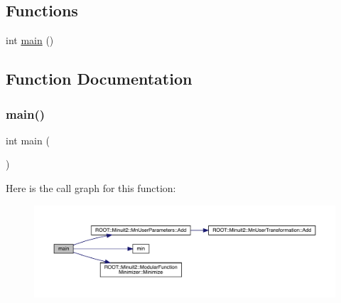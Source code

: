 \subsection*{Functions}
\begin{DoxyCompactItemize}
\item 
int \mbox{\hyperlink{adat-devel_2other__libs_2minuit_2test_2MnSim_2PaulTest4_8cxx_ae66f6b31b5ad750f1fe042a706a4e3d4}{main}} ()
\end{DoxyCompactItemize}


\subsection{Function Documentation}
\mbox{\label{adat-devel_2other__libs_2minuit_2test_2MnSim_2PaulTest4_8cxx_ae66f6b31b5ad750f1fe042a706a4e3d4}} 
\subsubsection{\texorpdfstring{main()}{main()}}
{\footnotesize\ttfamily int main (\begin{DoxyParamCaption}{ }\end{DoxyParamCaption})}

Here is the call graph for this function\+:
\nopagebreak
\begin{figure}[H]
\begin{center}
\leavevmode
\includegraphics[width=350pt]{d3/d43/adat-devel_2other__libs_2minuit_2test_2MnSim_2PaulTest4_8cxx_ae66f6b31b5ad750f1fe042a706a4e3d4_cgraph}
\end{center}
\end{figure}
